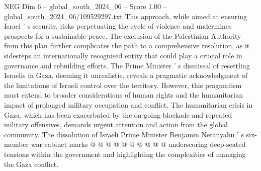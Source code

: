 \begin{textsample}{NEG Dim 6 – global\_south\_2024\_06 – Score 1.00 – global\_south\_2024\_06/109529297.txt}
This approach, while aimed at ensuring Israel ' s security, risks perpetuating the cycle of violence and undermines prospects for a sustainable peace.
The exclusion of the Palestinian Authority from this plan further complicates the path to a comprehensive resolution, as it sidesteps an internationally recognised entity that could play a crucial role in governance and rebuilding efforts.
The Prime Minister ' s dismissal of resettling Israelis in Gaza, deeming it unrealistic, reveals a pragmatic acknowledgment of the limitations of Israeli control over the territory.
However, this pragmatism must extend to broader considerations of human rights and the humanitarian impact of prolonged military occupation and conflict.
The humanitarian crisis in Gaza, which has been exacerbated by the on-going blockade and repeated military offensives, demands urgent attention and action from the global community.
The dissolution of Israeli Prime Minister Benjamin Netanyahu ' s six-member war cabinet marks @ @ @ @ @ @ @ @ @ @ underscoring deep-seated tensions within the government and highlighting the complexities of managing the Gaza conflict.

\end{textsample}
